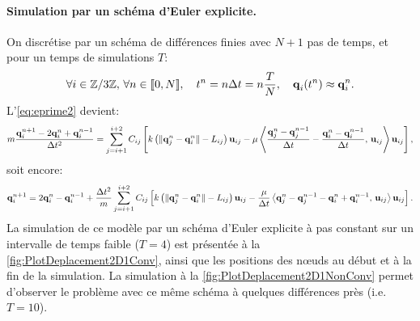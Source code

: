 \paragraph{Simulation par un schéma d'Euler explicite.}

On discrétise par un schéma de différences finies avec $N+1$ pas de temps, et pour un temps de simulations $T$:
$$
\forall i \in \mathbb{Z}/3\mathbb{Z}, \, \forall n \in [\![ 0,N ]\!], \quad  t^n = n\Delta t = n\frac{T}{N}, \quad \bm{\mathrm{q}}_i(t^n) \approx \bm{\mathrm{q}}_i^n.
$$
L'\cref{eq:eprime2} devient:
$$
m\frac{\bm{\mathrm{q}}_{i}^{n+1}-2\bm{\mathrm{q}}_{i}^{n}+\bm{\mathrm{q}}_{i}^{n-1}}{\Delta t^2} = \sum_{j=i+1}^{i+2}C_{ij}\left[ k \left( \Vert \bm{\mathrm{q}}_j^n - \bm{\mathrm{q}}_i^n \Vert - L_{ij} \right) \bm{\mathrm{u}}_{ij} - \mu \left\langle \frac{\bm{\mathrm{q}}_{j}^{n}-\bm{\mathrm{q}}_{j}^{n-1}}{\Delta t} - \frac{\bm{\mathrm{q}}_{i}^{n}-\bm{\mathrm{q}}_{i}^{n-1}}{\Delta t}, \, \bm{\mathrm{u}}_{ij} \right\rangle  \bm{\mathrm{u}}_{ij}  \right],
$$
soit encore:
\begin{align} \label{eq:systeme2D}
    \bm{\mathrm{q}}_{i}^{n+1} = 2\bm{\mathrm{q}}_{i}^{n}-\bm{\mathrm{q}}_{i}^{n-1} + \frac{\Delta t^2}{m} \sum_{j=i+1}^{i+2}C_{ij}\left[ k \left( \Vert \bm{\mathrm{q}}_j^n - \bm{\mathrm{q}}_i^n \Vert - L_{ij} \right) \bm{\mathrm{u}}_{ij} - \frac{\mu}{\Delta t} \left\langle \bm{\mathrm{q}}_{j}^{n}-\bm{\mathrm{q}}_{j}^{n-1} - \bm{\mathrm{q}}_{i}^{n}+\bm{\mathrm{q}}_{i}^{n-1}, \, \bm{\mathrm{u}}_{ij} \right\rangle  \bm{\mathrm{u}}_{ij}  \right].
\end{align}
La simulation de ce modèle par un schéma d'Euler explicite à pas constant sur un intervalle de temps faible ($T = 4$) est présentée à la \cref{fig:PlotDeplacement2D1Conv}, ainsi que les positions des n\oe{}uds au début et à la fin de la simulation. La simulation à la \cref{fig:PlotDeplacement2D1NonConv} permet d'observer le problème avec ce même schéma à quelques différences près (i.e. $T = 10$).


